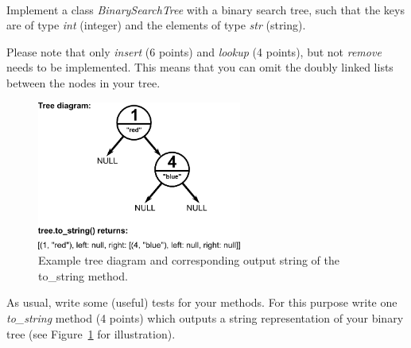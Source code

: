  \\
Implement a class \emph{BinarySearchTree} with a binary search tree, such that 
the keys are of type \emph{int} (integer) and the elements of type \emph{str} (string).

Please note that only \emph{insert} (6 points) and \emph{lookup} (4 points), 
but not \emph{remove} needs to be implemented. This means that you can omit the 
doubly linked lists between the nodes in your tree.

\begin{figure}[b]
  \begin{center}
    \includegraphics[width=0.6\textwidth]{Images/diagram.png}
  \end{center}
\caption{Example tree diagram and corresponding output string of the to\_string method.}
\label{fig:diagram}
\end{figure}

As usual, write some (useful) tests for your methods. For this purpose write 
one \emph{to\_string} method (4 points) which outputs a string representation of your binary tree (see Figure~\ref{fig:diagram} for illustration).

